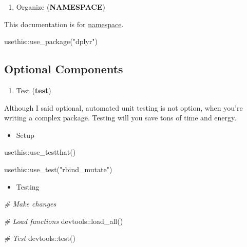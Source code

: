\documentclass[
]{book}
\newenvironment{Shaded}{\begin{snugshade}}{\end{snugshade}}
\newcommand{\CommentTok}[1]{\textcolor[rgb]{0.56,0.35,0.01}{\textit{#1}}}
\newcommand{\FunctionTok}[1]{\textcolor[rgb]{0.00,0.00,0.00}{#1}}
\newcommand{\NormalTok}[1]{#1}
\newcommand{\SpecialCharTok}[1]{\textcolor[rgb]{0.00,0.00,0.00}{#1}}
\newcommand{\StringTok}[1]{\textcolor[rgb]{0.31,0.60,0.02}{#1}}
\providecommand{\tightlist}{%
  \setlength{\itemsep}{0pt}\setlength{\parskip}{0pt}}
\begin{document}
\begin{enumerate}
\def\labelenumi{\arabic{enumi}.}
\setcounter{enumi}{3}
\tightlist
\item
  Organize (\textbf{NAMESPACE})
\end{enumerate}

This documentation is for \href{https://en.wikipedia.org/wiki/Namespace}{namespace}.

\begin{Shaded}
\begin{Highlighting}[]
\NormalTok{usethis}\SpecialCharTok{::}\FunctionTok{use\_package}\NormalTok{(}\StringTok{"dplyr"}\NormalTok{)}
\end{Highlighting}
\end{Shaded}

\hypertarget{optional-components}{%
\subsection{Optional Components}\label{optional-components}}

\begin{enumerate}
\def\labelenumi{\arabic{enumi}.}
\tightlist
\item
  Test (\textbf{test})
\end{enumerate}

Although I said optional, automated unit testing is not option, when you're writing a complex package. Testing will you save tons of time and energy.

\begin{itemize}
\tightlist
\item
  Setup
\end{itemize}

\begin{Shaded}
\begin{Highlighting}[]
\NormalTok{usethis}\SpecialCharTok{::}\FunctionTok{use\_testthat}\NormalTok{()}

\NormalTok{usethis}\SpecialCharTok{::}\FunctionTok{use\_test}\NormalTok{(}\StringTok{"rbind\_mutate"}\NormalTok{)}
\end{Highlighting}
\end{Shaded}

\begin{itemize}
\tightlist
\item
  Testing
\end{itemize}

\begin{Shaded}
\begin{Highlighting}[]
\CommentTok{\# Make changes }

\CommentTok{\# Load functions }
\NormalTok{devtools}\SpecialCharTok{::}\FunctionTok{load\_all}\NormalTok{()}

\CommentTok{\# Test }
\NormalTok{devtools}\SpecialCharTok{::}\FunctionTok{test}\NormalTok{()}
\end{Highlighting}
\end{Shaded}
\end{document}
